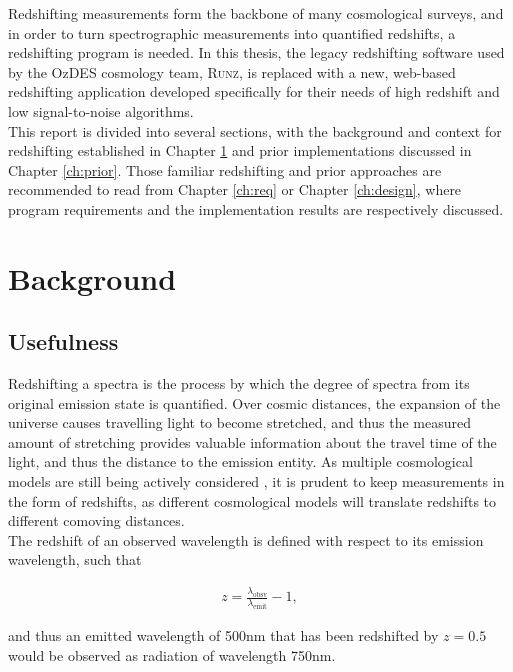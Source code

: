 \documentclass[titlesmallcaps, examinerscopy, copyrightpage]{uqthesis}
\newcommand{\runz}{\textsc{Runz}}
\begin{document}
Redshifting measurements form the backbone of many cosmological surveys, and in order to turn spectrographic measurements into quantified redshifts, a redshifting program is needed. In this thesis, the legacy redshifting software used by the OzDES cosmology team, \runz{}, is replaced with a new, web-based redshifting application developed specifically for their needs of high redshift and low signal-to-noise algorithms.\\

This report is divided into several sections, with the background and context for redshifting established in Chapter \ref{ch:back} and prior implementations discussed in Chapter \ref{ch:prior}. Those familiar redshifting and prior approaches are recommended to read from Chapter \ref{ch:req} or Chapter \ref{ch:design}, where program requirements and the implementation results are respectively discussed.



\chapter{Background}
\label{ch:back}

\section{Usefulness}

Redshifting a spectra is the process by which the degree of spectra from its original emission state is quantified. Over cosmic distances, the expansion of the universe causes travelling light to become stretched, and thus the measured amount of stretching provides valuable information about the travel time of the light, and thus the distance to the emission entity. As multiple cosmological models are still being actively considered \cite{davis2007scrutinizing}, it is prudent to keep measurements in the form of redshifts, as different cosmological models will translate redshifts to different comoving distances.\\

The redshift of an observed wavelength is defined with respect to its emission wavelength, such that

\begin{align}
z = \frac{\lambda_{\text{obsv}}}{\lambda_{\text{emit}}} - 1,
\end{align}

and thus an emitted wavelength of 500nm that has been redshifted by $z = 0.5$ would be observed as radiation of wavelength 750nm.
\end{document}
